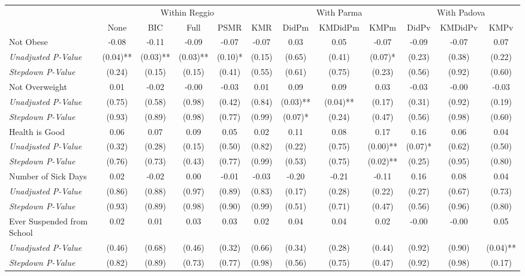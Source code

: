 \begin{tabular}{l c c c c c c c c c c c}
\toprule
& \multicolumn{5}{c}{Within Reggio} & \multicolumn{3}{c}{With Parma} & \multicolumn{3}{c}{With Padova} \\\cmidrule(lr){2-6} \cmidrule(lr){7-9} \cmidrule(lr){10-12}
 & None & BIC & Full & PSMR & KMR & DidPm & KMDidPm & KMPm & DidPv & KMDidPv & KMPv \\
\midrule
Not Obese & -0.08 & -0.11 & -0.09 & -0.07 & -0.07 & 0.03 & 0.05 & -0.07 & -0.09 & -0.07 & 0.07 \\
\quad \textit{Unadjusted P-Value} & (0.04)** & (0.03)** & (0.03)** & (0.10)* & (0.15) & (0.65) & (0.41) & (0.07)* & (0.23) & (0.38) & (0.22) \\
\quad \textit{Stepdown P-Value} & (0.24) & (0.15) & (0.15) & (0.41) & (0.55) & (0.61) & (0.75) & (0.23) & (0.56) & (0.92) & (0.60) \\
Not Overweight & 0.01 & -0.02 & -0.00 & -0.03 & 0.01 & 0.09 & 0.09 & 0.03 & -0.03 & -0.00 & -0.03 \\
\quad \textit{Unadjusted P-Value} & (0.75) & (0.58) & (0.98) & (0.42) & (0.84) & (0.03)** & (0.04)** & (0.17) & (0.31) & (0.92) & (0.19) \\
\quad \textit{Stepdown P-Value} & (0.93) & (0.89) & (0.98) & (0.77) & (0.99) & (0.07)* & (0.24) & (0.47) & (0.56) & (0.98) & (0.60) \\
Health is Good & 0.06 & 0.07 & 0.09 & 0.05 & 0.02 & 0.11 & 0.08 & 0.17 & 0.16 & 0.06 & 0.04 \\
\quad \textit{Unadjusted P-Value} & (0.32) & (0.28) & (0.15) & (0.50) & (0.82) & (0.22) & (0.75) & (0.00)** & (0.07)* & (0.62) & (0.50) \\
\quad \textit{Stepdown P-Value} & (0.76) & (0.73) & (0.43) & (0.77) & (0.99) & (0.53) & (0.75) & (0.02)** & (0.25) & (0.95) & (0.80) \\
Number of Sick Days & 0.02 & -0.02 & 0.00 & -0.01 & -0.03 & -0.20 & -0.21 & -0.11 & 0.16 & 0.08 & 0.04 \\
\quad \textit{Unadjusted P-Value} & (0.86) & (0.88) & (0.97) & (0.89) & (0.83) & (0.17) & (0.28) & (0.22) & (0.27) & (0.67) & (0.73) \\
\quad \textit{Stepdown P-Value} & (0.93) & (0.89) & (0.98) & (0.90) & (0.99) & (0.51) & (0.71) & (0.47) & (0.56) & (0.96) & (0.80) \\
Ever Suspended from School & 0.02 & 0.01 & 0.03 & 0.03 & 0.02 & 0.04 & 0.04 & 0.02 & -0.00 & -0.00 & 0.05 \\
\quad \textit{Unadjusted P-Value} & (0.46) & (0.68) & (0.46) & (0.32) & (0.66) & (0.34) & (0.28) & (0.44) & (0.92) & (0.90) & (0.04)** \\
\quad \textit{Stepdown P-Value} & (0.82) & (0.89) & (0.73) & (0.77) & (0.98) & (0.56) & (0.75) & (0.47) & (0.92) & (0.98) & (0.17) \\
\bottomrule
\end{tabular}
